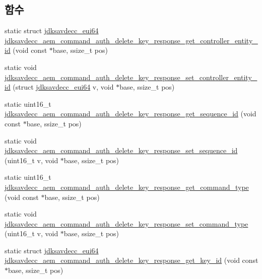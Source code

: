 \subsection*{함수}
\begin{DoxyCompactItemize}
\item 
static struct \hyperlink{structjdksavdecc__eui64}{jdksavdecc\+\_\+eui64} \hyperlink{group__command__auth__delete__key__response_gaef80511851e5bb39c984bb62fdd3b4a6}{jdksavdecc\+\_\+aem\+\_\+command\+\_\+auth\+\_\+delete\+\_\+key\+\_\+response\+\_\+get\+\_\+controller\+\_\+entity\+\_\+id} (void const $\ast$base, ssize\+\_\+t pos)
\item 
static void \hyperlink{group__command__auth__delete__key__response_ga2a40c56a9666658886547e6b3f35fe4f}{jdksavdecc\+\_\+aem\+\_\+command\+\_\+auth\+\_\+delete\+\_\+key\+\_\+response\+\_\+set\+\_\+controller\+\_\+entity\+\_\+id} (struct \hyperlink{structjdksavdecc__eui64}{jdksavdecc\+\_\+eui64} v, void $\ast$base, ssize\+\_\+t pos)
\item 
static uint16\+\_\+t \hyperlink{group__command__auth__delete__key__response_gabc6131aa55672dceafbf7b6ef2e89683}{jdksavdecc\+\_\+aem\+\_\+command\+\_\+auth\+\_\+delete\+\_\+key\+\_\+response\+\_\+get\+\_\+sequence\+\_\+id} (void const $\ast$base, ssize\+\_\+t pos)
\item 
static void \hyperlink{group__command__auth__delete__key__response_gae070db1c3c2b07b6ed7a9b12a7d92293}{jdksavdecc\+\_\+aem\+\_\+command\+\_\+auth\+\_\+delete\+\_\+key\+\_\+response\+\_\+set\+\_\+sequence\+\_\+id} (uint16\+\_\+t v, void $\ast$base, ssize\+\_\+t pos)
\item 
static uint16\+\_\+t \hyperlink{group__command__auth__delete__key__response_gaf08c6bc7c0e820018e190ee7d73a99f5}{jdksavdecc\+\_\+aem\+\_\+command\+\_\+auth\+\_\+delete\+\_\+key\+\_\+response\+\_\+get\+\_\+command\+\_\+type} (void const $\ast$base, ssize\+\_\+t pos)
\item 
static void \hyperlink{group__command__auth__delete__key__response_ga41036ecb132348a728b28df255e06604}{jdksavdecc\+\_\+aem\+\_\+command\+\_\+auth\+\_\+delete\+\_\+key\+\_\+response\+\_\+set\+\_\+command\+\_\+type} (uint16\+\_\+t v, void $\ast$base, ssize\+\_\+t pos)
\item 
static struct \hyperlink{structjdksavdecc__eui64}{jdksavdecc\+\_\+eui64} \hyperlink{group__command__auth__delete__key__response_ga983a000caa200d7d54596b3710a5e365}{jdksavdecc\+\_\+aem\+\_\+command\+\_\+auth\+\_\+delete\+\_\+key\+\_\+response\+\_\+get\+\_\+key\+\_\+id} (void const $\ast$base, ssize\+\_\+t pos)

\end{DoxyCompactItemize}
